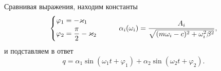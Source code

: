 Сравнивая выражения, находим константы
\begin{equation*}
\left\{\begin{aligned}
        \varphi_1 &= - \kappa_1 \\
        \varphi_2 &= \frac{\pi}{2} - \kappa_2
\end{aligned}\right.
\hspace{1 cm}
    \alpha_i (\omega_i) = \frac{A_i}{\sqrt{(m \omega_i-c)^2+\omega_i^2 \beta^2}},
\end{equation*}
и подставляем в ответ
\begin{equation*}
    q = \alpha_1 \sin (\omega_1 t + \varphi_1) + \alpha_2 \sin (\omega_2 t + \varphi_2).
\end{equation*}